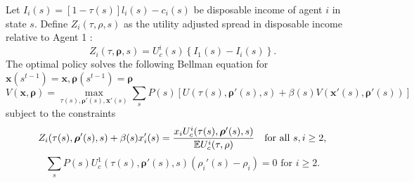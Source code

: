 \documentclass[thmsb,11pt]{article}
\begin{document}
Let $I_i(s)=[1-\tau(s)]l_i(s)-c_i(s)$ be  disposable income of agent $i$ in state $s$. Define $Z_i(\tau,\rho,s)$ as the utility adjusted spread in  disposable income relative to Agent 1 :
\[Z_i(\tau,\bm \rho,s)=U^i_c(s)\left\{I_1(s)-I_i(s)\right\}.\]
%
%
%
%
%
%
 The optimal policy  solves the following Bellman equation for $\bm{x}(s^{t-1})=\bm{x},\bm{\rho}(s^{t-1})=\bm{\rho}$
%
 \begin{equation}
 \label{eq:ss-obj}
 	V(\bm x,\bm \rho) = \max_{\tau(s),\bm \rho'(s),\bm x'(s)}\sum_s P(s)\left[ U(\tau(s),\bm \rho'(s),s) + \beta(s) V(\bm x'(s),\bm \rho'(s))\right]
 \end{equation}
subject to the constraints
 \begin{equation}
 \label{eq:ss-imp}
 	Z_i(\tau(s),\bm \rho'(s),s) +\beta(s) x'_i(s) = \frac{x_i U^i_c(\tau(s),\bm \rho'(s),s)}{\mathbb{E} U^i_c(\tau,\rho)}\text{   for all  $s,i \geq 2$,}\\
 \end{equation}
\begin{equation}
\label{eq:bondcondtion}
 	\sum_s P(s)U^1_c(\tau(s),\bm \rho'(s),s)(\rho_i'(s)-\rho_i) = 0 \text{  for $i \geq 2.$}
\end{equation}
\end{document}
